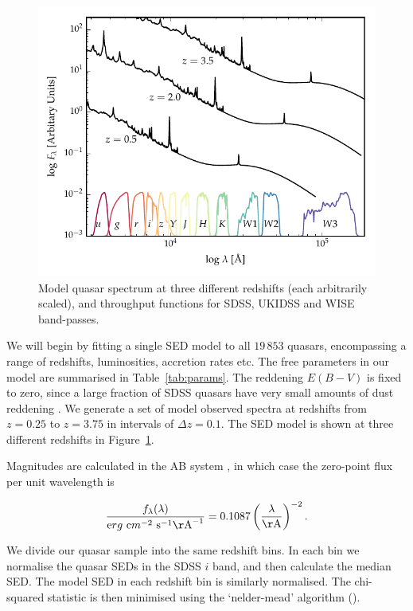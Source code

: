 \begin{figure}
  \centering
  \includegraphics[width=\textwidth]{figures/chapter05/throughput.pdf}
  \caption[{Model quasar spectrum at three different redshifts, and throughput functions for SDSS, UKIDSS and WISE band-passes.}]{Model quasar spectrum at three different redshifts (each arbitrarily scaled), and throughput functions for SDSS, UKIDSS and WISE band-passes.}
  \label{fig:filters}
\end{figure}

We will begin by fitting a single SED model to all $19\,853$ quasars, encompassing a range of redshifts, luminosities, accretion rates etc. 
The free parameters in our model are summarised in Table~\ref{tab:params}. 
The reddening $E(B-V)$ is fixed to zero, since a large fraction of SDSS quasars have very small amounts of dust reddening \citep{richards03}. 
We generate a set of model observed spectra at redshifts from $z=0.25$ to $z=3.75$ in intervals of $\Delta z = 0.1$. 
The SED model is shown at three different redshifts in Figure~\ref{fig:filters}. 

Magnitudes are calculated in the AB system \citep{oke83}, in which case the zero-point flux per unit wavelength is 

\begin{eqnarray}
  \frac{f_\lambda(\lambda)}{{\mathrm erg}~{\mathrm cm}^{-2}~{\mathrm s}^{-1} {\mathrm\AA}^{-1}} = 0.1087 \left(\frac{\lambda}{\mathrm \AA}\right)^{-2}.
\end{eqnarray}


We divide our quasar sample into the same redshift bins.
In each bin we normalise the quasar SEDs in the SDSS $i$ band, and then calculate the median SED. 
The model SED in each redshift bin is similarly normalised. 
The chi-squared statistic is then minimised using the `nelder-mead' algorithm (). 

